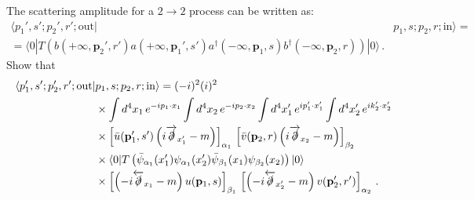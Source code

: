 \documentclass{tutorial}
\begin{document}
\begin{enumerate}
    The scattering amplitude for a $2\longrightarrow 2$ process can be
    written as: 
    \begin{align}
      \label{eq:4}
      \langle p_1', s'; p_2', r';\mathrm{out} | 
      &p_1, s; p_2, r; \mathrm{in} \rangle 
      = \nonumber \\
      = \langle 0 | T\left(
        b(+\infty,\mathbf{p}_2',r') a(+\infty,\mathbf{p}_1',s') 
        a^\dagger(-\infty,\mathbf{p}_1,s) b^\dagger(-\infty,\mathbf{p}_2,r)
        \right) |0 \rangle\, .
    \end{align}
    Show that
    \begin{align}
      \label{eq:5}
      \langle p_1', s'; p_2', r';\mathrm{out} |
      & p_1, s; p_2, r; \mathrm{in} \rangle = (-i)^{2} (i)^{2} \nonumber \\
      & \times \int d^4x_1\, e^{-i p_1\cdot x_1}  
        \int d^4x_2\, e^{-i p_2\cdot x_2}
        \int d^4x_1'\, e^{i p_1'\cdot x_1'} 
        \int d^4x_2'\, e^{i k_2'\cdot x_2'} \nonumber \\
      & \times \left[\bar{u}(\mathbf{p}_1',s') 
         \left(i\overrightarrow{\slashed{\partial}}_{x_1'} -
         m\right)\right]_{\alpha_1}\,  
         \left[\bar{v}(\mathbf{p}_2,r) 
         \left(i\overrightarrow{\slashed{\partial}}_{x_2} -
         m\right)\right]_{\beta_2}   \nonumber \\
      & \times \langle 0 | T\left(
        \bar\psi_{\alpha_1}(x_1') \psi_{\alpha_1}(x_2') \bar{\psi}_{\beta_1}(x_1) \psi_{\beta_2}(x_2)
        \right) |0 \rangle \nonumber \\
      & \times \left[\left(-i\overleftarrow{\slashed{\partial}}_{x_1} -
        m\right) u(\mathbf{p}_1,s)\right]_{\beta_1}\,  
        \left[\left(-i\overleftarrow{\slashed{\partial}}_{x_2'} -
        m\right) v(\mathbf{p}_2',r')\right]_{\alpha_2}\, .        
    \end{align}

\end{enumerate}
\end{document}

